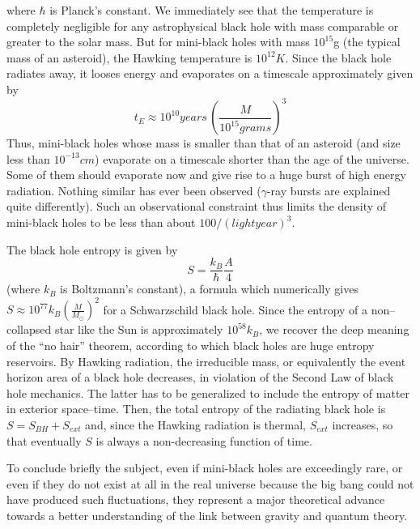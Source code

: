\documentclass[12pt]{article}
\begin{document}
where  $\hbar$
is Planck's constant. We immediately see that the temperature is completely
negligible for any astrophysical black hole with mass comparable or greater 
to the solar mass. But for mini-black holes with mass $10^{15}$g (the typical
mass of an asteroid), the Hawking temperature is $10^{12} K$. 
Since the black hole  radiates away, it looses energy and evaporates on a
timescale approximately given by 
\begin{equation}
  t_E \approx 10^{10} years \, \left(\frac{M}{10^{15} grams}\right)^3      
        \label{luminet:12}
 \end{equation}
Thus, mini-black holes whose mass is smaller than that of an asteroid (and
 size less than $10^{-13} cm$) evaporate on a timescale shorter than the
age of the universe. Some of them should evaporate now and give rise to a huge
burst of high energy radiation. Nothing similar has ever been observed 
($\gamma$-ray bursts are explained quite differently). Such an observational
constraint thus limits the density of mini-black holes to be less than about
$100 /(lightyear)^3$. 

The black hole entropy is given by
\begin{equation}
        S = \frac{k_B}{\hbar} \frac{A}{4}
        \label{luminet:13}
\end{equation}
 (where $k_B$ is Boltzmann's constant), a formula which numerically
gives $S \approx 10^{77} k_B(\frac{M}{M_{\odot}})^2$ for a Schwarzschild black hole.
Since the entropy of a non--collapsed star like the Sun is approximately
$10^{58} k_B$,
we recover the deep meaning of the ``no hair'' theorem, according to
which black holes are huge entropy reservoirs.
By Hawking radiation, the irreducible mass, or equivalently the event 
horizon area of a black hole decreases, in violation of the Second Law of black hole mechanics. The
latter has to be generalized to include the entropy of matter in exterior
space--time. Then, the total entropy of the radiating black hole is
$S = S_{BH} + S_{ext}$ and, since the Hawking radiation is thermal, $S_{ext}$
increases, so that eventually $S$ is always a non-decreasing function of time.  

To conclude briefly the subject, even if mini-black holes are exceedingly rare, or even if they do not
exist at all in the real universe because the big bang could not have produced 
such fluctuations, they
represent a major theoretical advance towards a better understanding 
of the link between gravity
and quantum theory. 
\end{document}

